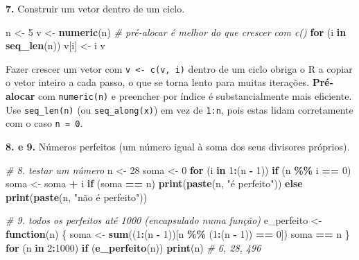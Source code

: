 \documentclass[
  portuguese,
  11pt,
  openany]{book}
\newenvironment{Shaded}{\begin{snugshade}}{\end{snugshade}}
\newcommand{\CommentTok}[1]{\textcolor[rgb]{0.56,0.35,0.01}{\textit{#1}}}
\newcommand{\ControlFlowTok}[1]{\textcolor[rgb]{0.13,0.29,0.53}{\textbf{#1}}}
\newcommand{\DecValTok}[1]{\textcolor[rgb]{0.00,0.00,0.81}{#1}}
\newcommand{\FunctionTok}[1]{\textcolor[rgb]{0.13,0.29,0.53}{\textbf{#1}}}
\newcommand{\NormalTok}[1]{#1}
\newcommand{\OtherTok}[1]{\textcolor[rgb]{0.56,0.35,0.01}{#1}}
\newcommand{\SpecialCharTok}[1]{\textcolor[rgb]{0.81,0.36,0.00}{\textbf{#1}}}
\newcommand{\StringTok}[1]{\textcolor[rgb]{0.31,0.60,0.02}{#1}}
\begin{document}
\textbf{7.} Construir um vetor dentro de um ciclo.

\begin{Shaded}
\begin{Highlighting}[]
\NormalTok{n }\OtherTok{\textless{}{-}} \DecValTok{5}
\NormalTok{v }\OtherTok{\textless{}{-}} \FunctionTok{numeric}\NormalTok{(n)                 }\CommentTok{\# pré{-}alocar é melhor do que crescer com c()}
\ControlFlowTok{for}\NormalTok{ (i }\ControlFlowTok{in} \FunctionTok{seq\_len}\NormalTok{(n)) v[i] }\OtherTok{\textless{}{-}}\NormalTok{ i}
\NormalTok{v}
\end{Highlighting}
\end{Shaded}

Fazer crescer um vetor com \texttt{v\ \textless{}-\ c(v,\ i)} dentro de um ciclo obriga o R a copiar
o vetor inteiro a cada passo, o que se torna lento para muitas iterações.
\textbf{Pré-alocar} com \texttt{numeric(n)} e preencher por índice é substancialmente mais
eficiente. Use \texttt{seq\_len(n)} (ou \texttt{seq\_along(x)}) em vez de \texttt{1:n}, pois estas
lidam corretamente com o caso \texttt{n\ =\ 0}.

\textbf{8. e 9.} Números perfeitos (um número igual à soma dos seus divisores próprios).

\begin{Shaded}
\begin{Highlighting}[]
\CommentTok{\# 8. testar um número}
\NormalTok{n }\OtherTok{\textless{}{-}} \DecValTok{28}
\NormalTok{soma }\OtherTok{\textless{}{-}} \DecValTok{0}
\ControlFlowTok{for}\NormalTok{ (i }\ControlFlowTok{in} \DecValTok{1}\SpecialCharTok{:}\NormalTok{(n }\SpecialCharTok{{-}} \DecValTok{1}\NormalTok{)) }\ControlFlowTok{if}\NormalTok{ (n }\SpecialCharTok{\%\%}\NormalTok{ i }\SpecialCharTok{==} \DecValTok{0}\NormalTok{) soma }\OtherTok{\textless{}{-}}\NormalTok{ soma }\SpecialCharTok{+}\NormalTok{ i}
\ControlFlowTok{if}\NormalTok{ (soma }\SpecialCharTok{==}\NormalTok{ n) }\FunctionTok{print}\NormalTok{(}\FunctionTok{paste}\NormalTok{(n, }\StringTok{"é perfeito"}\NormalTok{)) }\ControlFlowTok{else} \FunctionTok{print}\NormalTok{(}\FunctionTok{paste}\NormalTok{(n, }\StringTok{"não é perfeito"}\NormalTok{))}

\CommentTok{\# 9. todos os perfeitos até 1000 (encapsulado numa função)}
\NormalTok{e\_perfeito }\OtherTok{\textless{}{-}} \ControlFlowTok{function}\NormalTok{(n) \{}
\NormalTok{  soma }\OtherTok{\textless{}{-}} \FunctionTok{sum}\NormalTok{((}\DecValTok{1}\SpecialCharTok{:}\NormalTok{(n }\SpecialCharTok{{-}} \DecValTok{1}\NormalTok{))[n }\SpecialCharTok{\%\%}\NormalTok{ (}\DecValTok{1}\SpecialCharTok{:}\NormalTok{(n }\SpecialCharTok{{-}} \DecValTok{1}\NormalTok{)) }\SpecialCharTok{==} \DecValTok{0}\NormalTok{])}
\NormalTok{  soma }\SpecialCharTok{==}\NormalTok{ n}
\NormalTok{\}}
\ControlFlowTok{for}\NormalTok{ (n }\ControlFlowTok{in} \DecValTok{2}\SpecialCharTok{:}\DecValTok{1000}\NormalTok{) }\ControlFlowTok{if}\NormalTok{ (}\FunctionTok{e\_perfeito}\NormalTok{(n)) }\FunctionTok{print}\NormalTok{(n)   }\CommentTok{\# 6, 28, 496}
\end{Highlighting}
\end{Shaded}
\end{document}
